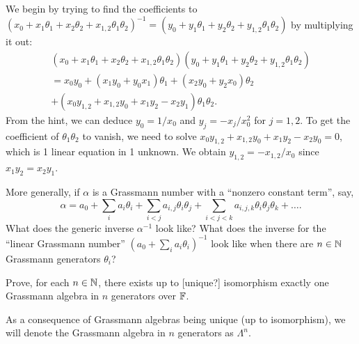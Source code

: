 \begin{answer}
  We begin by trying to find the coefficients to
  $(x_{0} + x_{1}\theta_{1} + x_{2}\theta_{2} + x_{1,2}\theta_{1}\theta_{2})^{-1}=(y_{0}+y_{1}\theta_{1}+y_{2}\theta_{2}+y_{1,2}\theta_{1}\theta_{2})$
  by multiplying it out:
\begin{multline}
(x_{0} + x_{1}\theta_{1} + x_{2}\theta_{2} + x_{1,2}\theta_{1}\theta_{2})(y_{0}+y_{1}\theta_{1}+y_{2}\theta_{2}+y_{1,2}\theta_{1}\theta_{2})\\
    = x_{0}y_{0} + (x_{1}y_{0} + y_{0}x_{1})\theta_{1}
    + (x_{2}y_{0} + y_{2}x_{0})\theta_{2}\\
    + (x_{0}y_{1,2} + x_{1,2}y_{0} + x_{1}y_{2} - x_{2}y_{1})\theta_{1}\theta_{2}.
\end{multline}
From the hint, we can deduce $y_{0}=1/x_{0}$ and $y_{j}=-x_{j}/x_{0}^{2}$
for $j=1,2$. To get the coefficient of $\theta_{1}\theta_{2}$ to vanish,
we need to solve $x_{0}y_{1,2}+x_{1,2}y_{0}+x_{1}y_{2}-x_{2}y_{0}=0$,
which is 1 linear equation in 1 unknown. We obtain
$y_{1,2} = -x_{1,2}/x_{0}$ since $x_{1}y_{2}=x_{2}y_{1}$.
\end{answer}

\begin{exercise}
More generally, if $\alpha$ is a Grassmann number with a ``nonzero
constant term'', say,
\begin{equation}
\alpha = a_{0} + \sum_{i}a_{i}\theta_{i} + \sum_{i<j}a_{i,j}\theta_{i}\theta_{j}
+\sum_{i<j<k}a_{i,j,k}\theta_{i}\theta_{j}\theta_{k}+\dots.
\end{equation}
What does the generic inverse $\alpha^{-1}$ look like? What does the
inverse for the ``linear Grassmann number'' $(a_{0} + \sum_{i}a_{i}\theta_{i})^{-1}$
look like when there are $n\in\mathbb{N}$ Grassmann generators $\theta_{i}$?
\end{exercise}

\begin{exercise}
Prove, for each $n\in\mathbb{N}$, there exists up to [unique?] isomorphism
exactly one Grassmann algebra in $n$ generators over $\mathbb{F}$.
\end{exercise}

 As a consequence of Grassmann algebras being unique (up to
isomorphism), we will denote the Grassmann algebra in $n$ generators as $\Lambda^{n}$.


